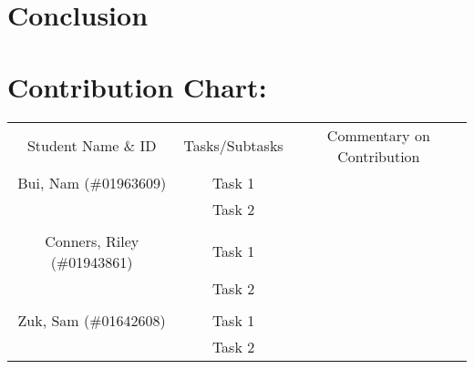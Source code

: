 \documentclass[11pt]{article}
\begin{document}


\section{Conclusion}

\section{Contribution Chart:}

\begin{table}[h]
    \centering
    \begin{tabular}{c|c|c}
        Student Name \& ID  & Tasks/Subtasks &  Commentary on Contribution \\
        Bui, Nam (\#01963609) & Task 1& \\
        & Task 2 & \\
        &&\\
        Conners, Riley (\#01943861) & Task 1& \\
        & Task 2 & \\
        &&\\
        Zuk, Sam (\#01642608)& Task 1& \\
        & Task 2 & \\
    \end{tabular}
    \label{tab:my_label}
\end{table}



\end{document}
